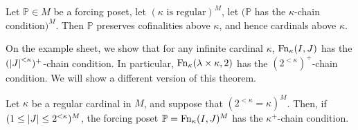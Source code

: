 \begin{theorem}
    Let \( \mathbb P \in M \) be a forcing poset, let \( (\kappa \text{ is regular})^M \), let \( (\mathbb P \) has the \( \kappa \)-chain condition\( )^M \).
    Then \( \mathbb P \) preserves cofinalities above \( \kappa \), and hence cardinals above \( \kappa \).
\end{theorem}
On the example sheet, we show that for any infinite cardinal \( \kappa \), \( \operatorname{Fn}_\kappa(I, J) \) has the \( (\abs{J}^{<\kappa})^+ \)-chain condition.
In particular, \( \operatorname{Fn}_\kappa(\lambda \times \kappa, 2) \) has the \( (2^{<\kappa})^+ \)-chain condition.
We will show a different version of this theorem.
\begin{lemma}
    Let \( \kappa \) be a regular cardinal in \( M \), and suppose that \( (2^{<\kappa} = \kappa)^M \).
    Then, if \( (1 \leq \abs{J} \leq 2^{<\kappa})^M \), the forcing poset \( \mathbb P = \operatorname{Fn}_\kappa(I, J)^M \) has the \( \kappa^+ \)-chain condition.
\end{lemma}
